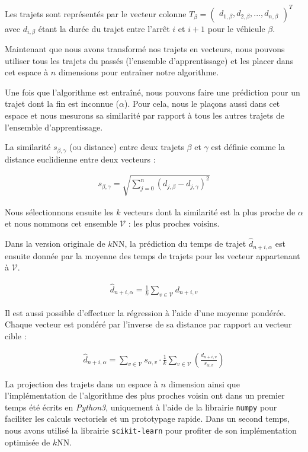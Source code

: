 \documentclass[letterpaper]{article}
\begin{document}
Les trajets sont représentés par le vecteur colonne
$T_{\beta} = \begin{pmatrix}d_{1,\beta}, d_{2,\beta}, ..., d_{n,\beta}\end{pmatrix}^{T}$
avec $d_{i,\beta}$ étant la durée du trajet entre l'arrêt $i$ et $i+1$ pour le véhicule $\beta$.

Maintenant que nous avons transformé nos trajets en vecteurs, nous pouvons utiliser tous les trajets du passés (l'ensemble d'apprentissage) et les placer dans cet espace à $n$ dimensions pour entraîner notre algorithme.

Une fois que l'algorithme est entraîné, nous pouvons faire une prédiction pour un trajet dont la fin est inconnue ($\alpha$). Pour cela, nous le plaçons aussi dans cet espace et nous mesurons sa similarité par rapport à tous les autres trajets de l'ensemble d'apprentissage.

La similarité $s_{\beta,\gamma}$ (ou distance) entre deux trajets $\beta$ et $\gamma$ est définie comme la distance euclidienne entre deux vecteurs :

\begin{eqnarray}
s_{\beta,\gamma} = \sqrt{\sum_{j=0}^{n}(d_{j,\beta} - d_{j,\gamma})^2}
\end{eqnarray}

Nous sélectionnons ensuite les $k$ vecteurs dont la similarité est la plus proche de $\alpha$ et nous nommons cet ensemble $\mathcal{V}$ : les plus proches voisins.

Dans la version originale de $k$NN, la prédiction du temps de trajet $\hat{d}_{n+i,\alpha}$ est ensuite donnée par la moyenne des temps de trajets pour les vecteur appartenant à $\mathcal{V}$.

\begin{eqnarray}
\hat{d}_{n+i,\alpha} = \frac{1}{k} \sum_{v \in \mathcal{V}}d_{n+i,v}
\end{eqnarray}

Il est aussi possible d'effectuer la régression à l'aide d'une moyenne pondérée. Chaque vecteur est pondéré par l'inverse de sa distance par rapport au vecteur cible :

\begin{eqnarray}
\hat{d}_{n+i,\alpha} = \sum_{v \in \mathcal{V}} s_{\alpha, v} \cdot \frac{1}{k} \sum_{v \in \mathcal{V}}( \frac{d_{n+i,v}}{s_{\alpha, v}})
\end{eqnarray}

La projection des trajets dans un espace à $n$ dimension ainsi que l'implémentation de l'algorithme des plus proches voisin ont dans un premier temps été écrits en \textit{Python3}, uniquement à l'aide de la librairie \texttt{numpy} pour faciliter les calculs vectoriels et un prototypage rapide. Dans un second temps, nous avons utilisé la librairie \texttt{scikit-learn} pour profiter de son implémentation optimisée de $k$NN.
\end{document}
